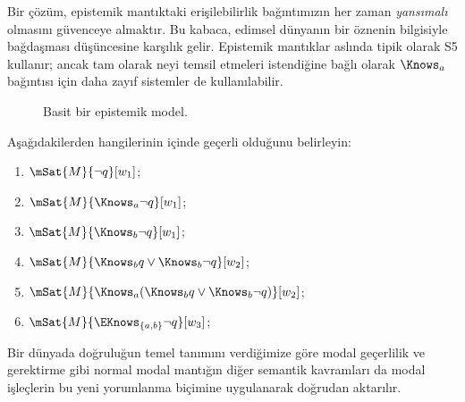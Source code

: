\documentclass[../../../include/open-logic-section]{subfiles}
\begin{document}
Bir çözüm, epistemik mantıktaki erişilebilirlik bağıntımızın her zaman
\emph{yansımalı} olmasını güvenceye almaktır. Bu kabaca, edimsel dünyanın bir
öznenin bilgisiyle bağdaşması düşüncesine karşılık gelir. Epistemik mantıklar
aslında tipik olarak S5 kullanır; ancak tam olarak neyi temsil etmeleri
istendiğine bağlı olarak $\Knows_a$ bağıntısı için daha zayıf sistemler de
kullanılabilir.

\begin{figure}
  \begin{center}
  \end{center}
  \caption{Basit bir epistemik model.}
\end{figure}

\begin{prob}
  Aşağıdakilerden hangilerinin  içinde
  geçerli olduğunu belirleyin:
  \begin{enumerate}
    \item $\mSat{M}{\lnot q}[w_1]$;
    \item $\mSat{M}{\Knows_a \lnot q}[w_1]$;
    \item $\mSat{M}{\Knows_b \lnot q}[w_1]$;
    \item $\mSat{M}{\Knows_b q \lor \Knows_b \lnot q}[w_2]$;
    \item $\mSat{M}{\Knows_a( \Knows_b q \lor \Knows_b \lnot q)}[w_2]$;
    \item $\mSat{M}{\EKnows_{\{a,b\}} \lnot q}[w_3]$;
    \end{enumerate}
\end{prob}

Bir dünyada doğruluğun temel tanımını verdiğimize göre modal geçerlilik ve
gerektirme gibi normal modal mantığın diğer semantik kavramları da modal
işleçlerin bu yeni yorumlanma biçimine uygulanarak doğrudan aktarılır.
\end{document}
